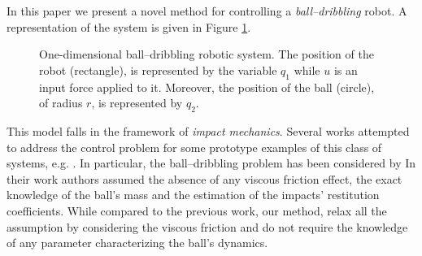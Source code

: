 {In this paper we present a novel method for controlling a \textit{ball--dribbling} robot.
A representation of the system is given in Figure \ref{fig:1D}.
\begin{figure}[!t]
	\centering
	\caption{\footnotesize One-dimensional ball--dribbling robotic system. The position of the robot (rectangle), is represented by the variable $q_1$ while $u$ is an input force applied to it. Moreover, the position of the ball (circle), of radius $r$, is represented by $q_2$. }
	\label{fig:1D}
\end{figure}
This model falls in the framework of \textit{impact mechanics}. Several works attempted to address the control problem for some prototype examples of this class of systems, e.g. \cite{sanfelice2007hybrid,tian2013juggling,6094506}. In particular, the ball--dribbling problem has been considered by \cite{Batz2010} In their work authors assumed the absence of any viscous friction effect, the exact knowledge of the ball's mass and the estimation of the impacts' restitution coefficients. While compared to the previous work, our method, relax all the assumption by considering the viscous friction and do not require the knowledge of any parameter characterizing the ball's dynamics.

}
